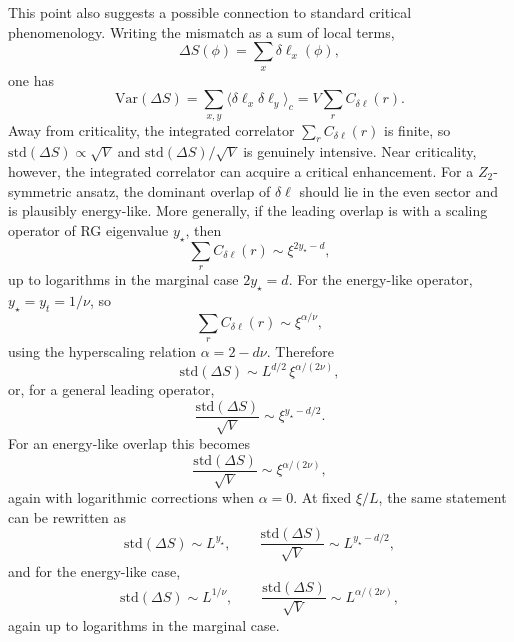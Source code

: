 \documentclass[aps,prd,reprint,nofootinbib,superscriptaddress,longbibliography]{revtex4-2}
\newcommand{\std}{\mathrm{std}}
\begin{document}
This point also suggests a possible connection to standard critical
phenomenology. Writing the mismatch as a sum of local terms,
\begin{equation}
\Delta S(\phi)=\sum_x \delta \ell_x(\phi),
\end{equation}
one has
\begin{equation}
\mathrm{Var}(\Delta S)=\sum_{x,y}
\langle \delta \ell_x \delta \ell_y\rangle_c
=
V\sum_r C_{\delta \ell}(r).
\end{equation}
Away from criticality, the integrated correlator $\sum_r C_{\delta \ell}(r)$ is
finite, so $\std(\Delta S)\propto \sqrt{V}$ and
$\std(\Delta S)/\sqrt{V}$ is genuinely intensive. Near criticality, however, the
integrated correlator can acquire a critical enhancement. For a $Z_2$-symmetric
ansatz, the dominant overlap of $\delta \ell$ should lie in the even sector and
is plausibly energy-like. More generally, if the leading overlap is with a
scaling operator of RG eigenvalue $y_\star$, then
\begin{equation}
\sum_r C_{\delta \ell}(r)\sim \xi^{2y_\star-d},
\end{equation}
up to logarithms in the marginal case $2y_\star=d$. For the energy-like
operator, $y_\star=y_t=1/\nu$, so
\begin{equation}
\sum_r C_{\delta \ell}(r)\sim \xi^{\alpha/\nu},
\end{equation}
using the hyperscaling relation $\alpha = 2-d\nu$. Therefore
\begin{equation}
\std(\Delta S)\sim L^{d/2}\,\xi^{\alpha/(2\nu)},
\end{equation}
or, for a general leading operator,
\begin{equation}
\frac{\std(\Delta S)}{\sqrt{V}}
\sim
\xi^{y_\star-d/2}.
\end{equation}
For an energy-like overlap this becomes
\begin{equation}
\frac{\std(\Delta S)}{\sqrt{V}}
\sim
\xi^{\alpha/(2\nu)},
\end{equation}
again with logarithmic corrections when $\alpha=0$. At fixed $\xi/L$, the same
statement can be rewritten as
\begin{equation}
\std(\Delta S)\sim L^{y_\star},
\qquad
\frac{\std(\Delta S)}{\sqrt{V}}\sim L^{y_\star-d/2},
\end{equation}
and for the energy-like case,
\begin{equation}
\std(\Delta S)\sim L^{1/\nu},
\qquad
\frac{\std(\Delta S)}{\sqrt{V}}\sim L^{\alpha/(2\nu)},
\end{equation}
again up to logarithms in the marginal case.
\end{document}
